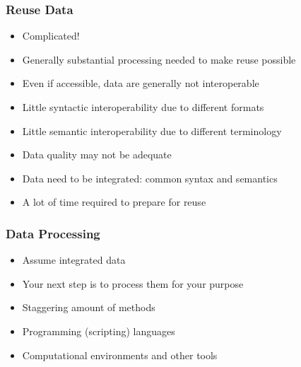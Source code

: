 \documentclass{beamer}
\begin{document}
{
	\begin{frame}[plain]
	\end{frame}
}

\begin{frame}
  \frametitle{Reuse Data}
  
  \begin{itemize}
  \item Complicated!
  \item Generally substantial processing needed to make reuse possible
  \item Even if accessible, data are generally not interoperable
  \item Little syntactic interoperability due to different formats
  \item Little semantic interoperability due to different terminology
  \item Data quality may not be adequate
  \item Data need to be integrated: common syntax and semantics
  \item A lot of time required to prepare for reuse
  \end{itemize}
\end{frame}

\begin{frame}
  \frametitle{Data Processing}
  
  \begin{itemize}
  \item Assume integrated data
  \item Your next step is to process them for your purpose
  \item Staggering amount of methods
  \item Programming (scripting) languages
  \item Computational environments and other tools
  \end{itemize}
\end{frame}
\end{document}
